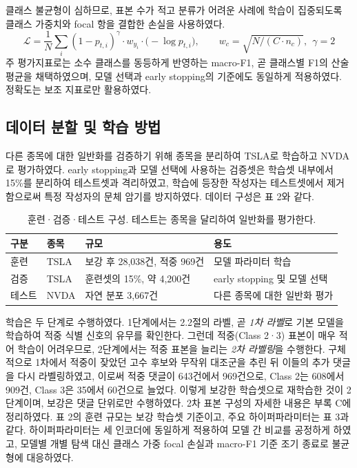 \documentclass[11pt]{article}
\begin{document}
클래스 불균형이 심하므로, 표본 수가 적고 분류가 어려운 사례에 학습이 집중되도록 클래스 가중치와 focal 항을 결합한 손실을 사용하였다.
\begin{equation}
\mathcal{L}=\frac{1}{N}\sum_i (1-p_{t,i})^{\gamma}\cdot w_{y_i}\cdot\bigl(-\log p_{t,i}\bigr),\qquad
w_c=\sqrt{N/(C\cdot n_c)},\ \ \gamma=2
\end{equation}
주 평가지표로는 소수 클래스를 동등하게 반영하는 macro-F1, 곧 클래스별 F1의 산술 평균을 채택하였으며, 모델 선택과 early stopping의 기준에도 동일하게 적용하였다. 정확도는 보조 지표로만 활용하였다.

\subsection{데이터 분할 및 학습 방법}

다른 종목에 대한 일반화를 검증하기 위해 종목을 분리하여 TSLA로 학습하고 NVDA로 평가하였다. early stopping과 모델 선택에 사용하는 검증셋은 학습셋 내부에서 15\%를 분리하여 테스트셋과 격리하였고, 학습에 등장한 작성자는 테스트셋에서 제거함으로써 특정 작성자의 문체 암기를 방지하였다. 데이터 구성은 표 2와 같다.

\begin{table}[H]
\centering
\begin{tabular}{@{}llll@{}}
\toprule
\textbf{구분} & \textbf{종목} & \textbf{규모} & \textbf{용도} \\
\midrule
훈련 & TSLA & 보강 후 28,038건, 적중 969건 & 모델 파라미터 학습 \\
검증 & TSLA & 훈련셋의 15\%, 약 4,200건 & early stopping 및 모델 선택 \\
테스트 & NVDA & 자연 분포 3,667건 & 다른 종목에 대한 일반화 평가 \\
\bottomrule
\end{tabular}
\caption{훈련·검증·테스트 구성. 테스트는 종목을 달리하여 일반화를 평가한다.}
\end{table}

학습은 두 단계로 수행하였다. 1단계에서는 2.2절의 라벨, 곧 \emph{1차 라벨}로 기본 모델을 학습하여 적중 식별 신호의 유무를 확인한다. 그런데 적중(Class 2·3) 표본이 매우 적어 학습이 어려우므로, 2단계에서는 적중 표본을 늘리는 \emph{2차 라벨링}을 수행한다. 구체적으로 1차에서 적중이 잦았던 고수 후보와 무작위 대조군을 추린 뒤 이들의 추가 댓글을 다시 라벨링하였고, 이로써 적중 댓글이 643건에서 969건으로, Class 2는 608에서 909건, Class 3은 35에서 60건으로 늘었다. 이렇게 보강한 학습셋으로 재학습한 것이 2단계이며, 보강은 댓글 단위로만 수행하였다. 2차 표본 구성의 자세한 내용은 부록 C에 정리하였다. 표 2의 훈련 규모는 보강 학습셋 기준이고, 주요 하이퍼파라미터는 표 3과 같다. 하이퍼파라미터는 세 인코더에 동일하게 적용하여 모델 간 비교를 공정하게 하였고, 모델별 개별 탐색 대신 클래스 가중 focal 손실과 macro-F1 기준 조기 종료로 불균형에 대응하였다.
\end{document}
